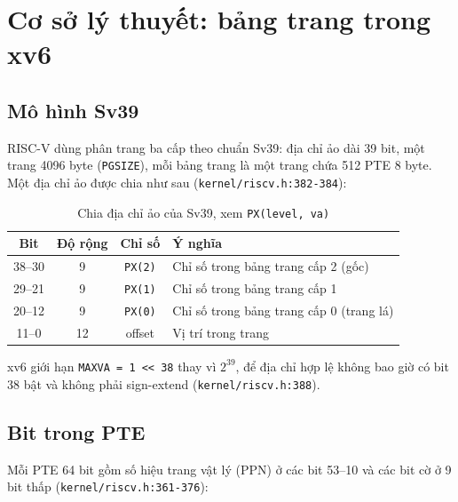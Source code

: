 \chapter{Cơ sở lý thuyết: bảng trang trong xv6}

\newpage

\section{Mô hình Sv39}

RISC-V dùng phân trang ba cấp theo chuẩn Sv39: địa chỉ ảo dài 39 bit, một trang 4096 byte (\texttt{PGSIZE}), mỗi bảng trang là một trang chứa 512 PTE 8 byte. Một địa chỉ ảo được chia như sau (\texttt{kernel/riscv.h:382-384}):

\begin{table}[H]
    \centering
    \renewcommand{\arraystretch}{1.3}
    \setlength{\tabcolsep}{8pt}
    \begin{tabular}{|c|c|c|l|}
        \hline
        \rowcolor[rgb]{0.8, 0.9, 1.0}
        \textbf{Bit} & \textbf{Độ rộng} & \textbf{Chỉ số} & \textbf{Ý nghĩa} \\ \hline
        38--30 & 9 & \texttt{PX(2)} & Chỉ số trong bảng trang cấp 2 (gốc) \\ \hline
        29--21 & 9 & \texttt{PX(1)} & Chỉ số trong bảng trang cấp 1 \\ \hline
        20--12 & 9 & \texttt{PX(0)} & Chỉ số trong bảng trang cấp 0 (trang lá) \\ \hline
        11--0 & 12 & offset & Vị trí trong trang \\ \hline
    \end{tabular}
    \caption{Chia địa chỉ ảo của Sv39, xem \texttt{PX(level, va)}}
\end{table}

xv6 giới hạn \texttt{MAXVA = 1 << 38} thay vì $2^{39}$, để địa chỉ hợp lệ không bao giờ có bit 38 bật và không phải sign-extend (\texttt{kernel/riscv.h:388}).

\section{Bit trong PTE}

Mỗi PTE 64 bit gồm số hiệu trang vật lý (PPN) ở các bit 53--10 và các bit cờ ở 9 bit thấp (\texttt{kernel/riscv.h:361-376}):

